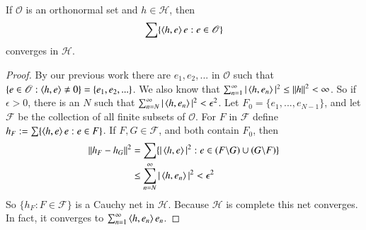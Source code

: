 \begin{lem}
    If $\mathscr{O}$ is an orthonormal set and $h \in \mathscr{H}$, then $$\sum\{\left\langle h, e\right\rangle e:e \in \mathscr{O}\}$$
    converges in $\mathscr{H}$.
\end{lem}
\begin{proof}
    By our previous work there are $e_1,e_2,...$ in $\mathscr{O}$ such that $\{e\in \mathscr{O}:\left\langle h, e\right\rangle \neq 0\} = \{e_1,e_2,...\}$. We also know that $\sum_{n=1}^{\infty}|\left\langle h, e_n\right\rangle|^2 \leq \left|\left| h\right|\right|^2 < \infty$. So if $\epsilon > 0$, there is an $N$ such that $\sum_{n=N}^{\infty}|\left\langle h, e_n\right\rangle|^2 < \epsilon^2$. Let $F_0 = \{e_1,...,e_{N-1}\}$, and let $\mathscr{F}$ be the collection of all finite subsets of $\mathscr{O}$. For $F$ in $\mathscr{F}$ define $h_F := \sum\{\left\langle h, e\right\rangle e:e \in F\}$. If $F,G \in \mathscr{F}$, and both contain $F_0$, then 
    \begin{align*}
        \left|\left| h_F-h_G\right|\right|^2 &= \sum\{|\left\langle h, e\right\rangle|^2:e \in (F\backslash G)\cup (G\backslash F)\}  \\
        &\leq \sum_{n=N}^{\infty}|\left\langle h, e_n\right\rangle|^2 < \epsilon^2
    \end{align*}
    So $\{h_F:F \in \mathscr{F}\}$ is a Cauchy net in $\mathscr{H}$. Because $\mathscr{H}$ is complete this net converges. In fact, it converges to $\sum_{n=1}^{\infty}\left\langle h, e_n\right\rangle e_n$.
\end{proof}


